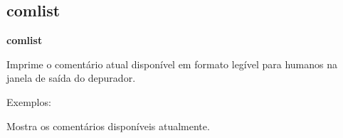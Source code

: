 \documentclass[letterpaper,10pt,brazil]{sphinxmanual}
\begin{document}
\subsection{comlist}
\label{debugger/annotation:comlist}\label{debugger/annotation:debugger-command-comlist}
\begin{DUlineblock}{0em}
\item[]
\begin{DUlineblock}{\DUlineblockindent}
\item[] \textbf{comlist}
\item[] 
\end{DUlineblock}
\item[] Imprime o comentário atual disponível em formato legível para humanos na janela de saída do depurador.
\item[] 
\item[] Exemplos:
\item[] 
\item[]
\begin{DUlineblock}{\DUlineblockindent}
\item[] 
\item[] 
\end{DUlineblock}
\item[] Mostra os comentários disponíveis atualmente.
\end{DUlineblock}
\begin{quote}
\label{debugger/annotation:debugger-command-commit}\end{quote}
\end{document}
